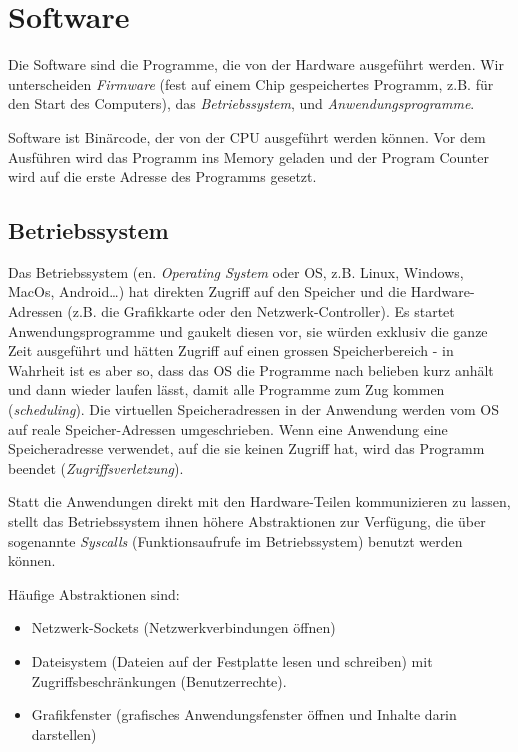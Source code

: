 \section{Software}

Die Software sind die Programme, die von der Hardware ausgeführt werden. Wir unterscheiden \emph{Firmware} (fest auf einem Chip gespeichertes Programm, z.B. für den Start des Computers), das \emph{Betriebssystem}, und \emph{Anwendungsprogramme}.

Software ist Binärcode, der von der CPU ausgeführt werden können. Vor dem Ausführen wird das Programm ins Memory geladen und der Program Counter wird auf die erste Adresse des Programms gesetzt.

\subsection{Betriebssystem}

Das Betriebssystem (en. \emph{Operating System} oder OS, z.B. Linux, Windows, MacOs, Android…) hat direkten Zugriff auf den Speicher und die Hardware-Adressen (z.B. die Grafikkarte oder den Netzwerk-Controller). Es startet Anwendungsprogramme und gaukelt diesen vor, sie würden exklusiv die ganze Zeit ausgeführt und hätten Zugriff auf einen grossen Speicherbereich - in Wahrheit ist es aber so, dass das OS die Programme nach belieben kurz anhält und dann wieder laufen lässt, damit alle Programme zum Zug kommen (\emph{scheduling}). Die virtuellen Speicheradressen in der Anwendung werden vom OS auf reale Speicher-Adressen umgeschrieben. Wenn eine Anwendung eine Speicheradresse verwendet, auf die sie keinen Zugriff hat, wird das Programm beendet (\emph{Zugriffsverletzung}). 

Statt die Anwendungen direkt mit den Hardware-Teilen kommunizieren zu lassen, stellt das Betriebssystem ihnen höhere Abstraktionen zur Verfügung, die über sogenannte \emph{Syscalls} (Funktionsaufrufe im Betriebssystem) benutzt werden können.

Häufige Abstraktionen sind:

\begin{itemize}
    \item Netzwerk-Sockets (Netzwerkverbindungen öffnen)
    \item Dateisystem (Dateien auf der Festplatte lesen und schreiben) mit Zugriffsbeschränkungen (Benutzerrechte).
    \item Grafikfenster (grafisches Anwendungsfenster öffnen und Inhalte darin darstellen)
\end{itemize}

